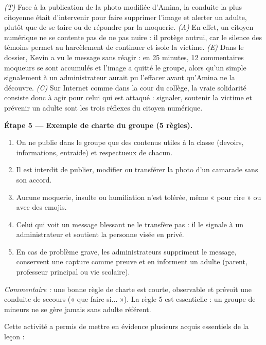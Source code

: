 \documentclass[11pt]{article}
\newcounter{popsec}
\newcounter{popsub}
\newcommand{\courssub}[1]{%
  \stepcounter{popsub}%
  \par\vspace{9pt}\noindent{\popxbold\fontsize{11.5}{13}\selectfont\color{popink}{\color{poporange}\thepopsec.\thepopsub}\hspace{6pt}#1}\par\nopagebreak\vspace{4pt}
}
\begin{document}
\begin{exoresolu}
\emph{(T)} Face à la publication de la photo modifiée d'Amina, la conduite la plus citoyenne était d'intervenir pour faire supprimer l'image et alerter un adulte, plutôt que de se taire ou de répondre par la moquerie. \emph{(A)} En effet, un citoyen numérique ne se contente pas de ne pas nuire : il protège autrui, car le silence des témoins permet au harcèlement de continuer et isole la victime. \emph{(E)} Dans le dossier, Kevin a vu le message sans réagir : en 25 minutes, 12 commentaires moqueurs se sont accumulés et l'image a quitté le groupe, alors qu'un simple signalement à un administrateur aurait pu l'effacer avant qu'Amina ne la découvre. \emph{(C)} Sur Internet comme dans la cour du collège, la vraie solidarité consiste donc à agir pour celui qui est attaqué : signaler, soutenir la victime et prévenir un adulte sont les trois réflexes du citoyen numérique.

\textbf{Étape 5 — Exemple de charte du groupe (5 règles).}

\begin{enumerate}
\item On ne publie dans le groupe que des contenus utiles à la classe (devoirs, informations, entraide) et respectueux de chacun.
\item Il est interdit de publier, modifier ou transférer la photo d'un camarade sans son accord.
\item Aucune moquerie, insulte ou humiliation n'est tolérée, même « pour rire » ou avec des emojis.
\item Celui qui voit un message blessant ne le transfère pas : il le signale à un administrateur et soutient la personne visée en privé.
\item En cas de problème grave, les administrateurs suppriment le message, conservent une capture comme preuve et en informent un adulte (parent, professeur principal ou vie scolaire).
\end{enumerate}

\emph{Commentaire :} une bonne règle de charte est courte, observable et prévoit une conduite de secours (« que faire si... »). La règle 5 est essentielle : un groupe de mineurs ne se gère jamais sans adulte référent.
\end{exoresolu}

\courssub{Bilan de l'activité}

Cette activité a permis de mettre en évidence plusieurs acquis essentiels de la leçon :
\end{document}
